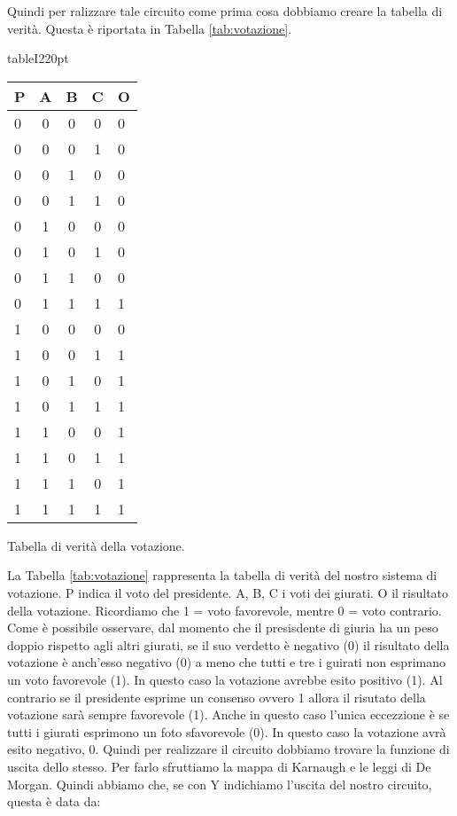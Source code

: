 Quindi per ralizzare tale circuito come prima cosa dobbiamo creare la tabella di verità. Questa è riportata in Tabella \ref{tab:votazione}.

\begin{wrapfloat}{table}{I}{220pt}
\centering
\begin{tabular}{l c c c | l}
	\toprule
		P & A & B & C & O \\
	\midrule
		0 & 0 & 0 & 0 & 0 \\
		0 & 0 & 0 & 1 & 0 \\
		0 & 0 & 1 & 0 & 0 \\
		0 & 0 & 1 & 1 & 0 \\
		0 & 1 & 0 & 0 & 0 \\
		0 & 1 & 0 & 1 & 0 \\
		0 & 1 & 1 & 0 & 0 \\
		0 & 1 & 1 & 1 & 1 \\
		1 & 0 & 0 & 0 & 0 \\
		1 & 0 & 0 & 1 & 1 \\
		1 & 0 & 1 & 0 & 1 \\
		1 & 0 & 1 & 1 & 1 \\
		1 & 1 & 0 & 0 & 1 \\
		1 & 1 & 0 & 1 & 1 \\
		1 & 1 & 1 & 0 & 1 \\
		1 & 1 & 1 & 1 & 1 \\
	\bottomrule
\end{tabular}
\caption{Tabella di verità della votazione.}
\label{tab:votazione}
\end{wrapfloat}

La Tabella \ref{tab:votazione} rappresenta la tabella di verità del nostro sistema di votazione.
P indica il voto del presidente. A, B, C i voti dei giurati. O il risultato della votazione. Ricordiamo che 1 = voto favorevole, mentre 0 = voto contrario.
Come è possibile osservare, dal momento che il presisdente di giuria ha un peso doppio rispetto agli altri giurati, se il suo verdetto è negativo (0) il risultato della votazione è anch'esso negativo (0) a meno che tutti e tre i guirati non esprimano un voto favorevole (1). In questo caso la votazione avrebbe esito positivo (1). Al contrario se il presidente esprime un consenso ovvero 1 allora il risutato della votazione sarà sempre favorevole (1). Anche in questo caso l'unica eccezzione è se tutti i giurati esprimono un foto sfavorevole (0). In questo caso la votazione avrà esito negativo, 0.
Quindi per realizzare il circuito dobbiamo trovare la funzione di uscita dello stesso. Per farlo sfruttiamo la mappa di Karnaugh e le leggi di De Morgan. Quindi abbiamo che, se con Y indichiamo l'uscita del nostro circuito, questa è data da:


